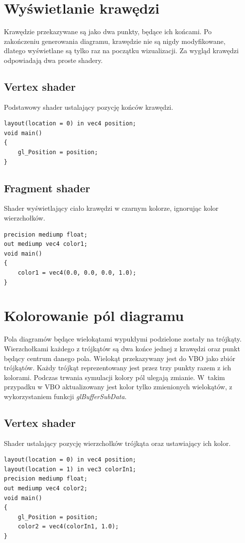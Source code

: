 \documentclass[declaration,shortabstract, inz]{iithesis}
\theoremstyle{definition} \newtheorem{definition}{Definicja}[]
\theoremstyle{plain} \newtheorem{remark}[definition]{Obserwacja}
\theoremstyle{plain} \newtheorem{theorem}[definition]{Twierdzenie}
\theoremstyle{plain} \newtheorem{example}{Przykład}[definition]
\theoremstyle{plain} \newtheorem{lemma}[definition]{Lemat}
\begin{document}
\section{Wyświetlanie krawędzi}

Krawędzie przekazywane są jako dwa punkty, będące ich końcami. Po zakończeniu generowania diagramu, krawędzie nie są nigdy modyfikowane, dlatego wyświetlane są tylko raz na początku wizualizacji. Za wygląd krawędzi odpowiadają dwa proste shadery. 

\subsection{Vertex shader}
Podstawowy shader ustalający pozycję końców krawędzi.
\begin{center}
\begin{lstlisting}
layout(location = 0) in vec4 position;
void main()
{
	gl_Position = position;
}
\end{lstlisting}
\end{center}

\subsection{Fragment shader}
Shader wyświetlający ciało krawędzi w czarnym kolorze, ignorując kolor wierzchołków.
\begin{center}
\begin{lstlisting}
precision mediump float;
out mediump vec4 color1;
void main()
{
	color1 = vec4(0.0, 0.0, 0.0, 1.0);
}
\end{lstlisting}
\end{center}

\section{Kolorowanie pól diagramu}

Pola diagramów będące wielokątami wypukłymi podzielone zostały na trójkąty. Wierzchołkami każdego z trójkątów są dwa końce jednej z krawędzi oraz punkt będący centrum danego pola. Wielokąt przekazywany jest do VBO jako zbiór trójkątów. Każdy trójkąt reprezentowany jest przez trzy punkty razem z ich kolorami. Podczas trwania symulacji kolory pól ulegają zmianie. W~takim przypadku w VBO aktualizowany jest kolor tylko zmienionych wielokątów, z wykorzystaniem funkcji \textit{glBufferSubData}.

\subsection{Vertex shader}
Shader ustalający pozycję wierzchołków trójkąta oraz ustawiający ich kolor.
\begin{center}
\begin{lstlisting}
layout(location = 0) in vec4 position;
layout(location = 1) in vec3 colorIn1;
precision mediump float;
out mediump vec4 color2;
void main()
{
	gl_Position = position;
	color2 = vec4(colorIn1, 1.0);
}
\end{lstlisting}
\end{center}
\end{document}
